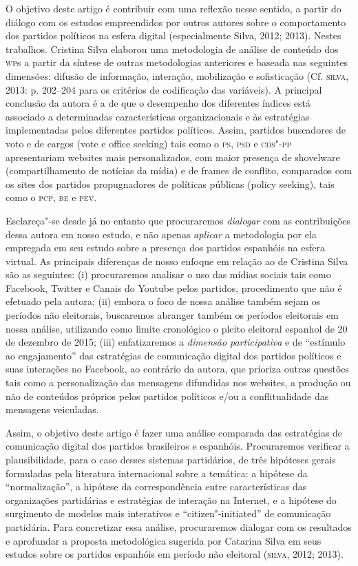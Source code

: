O objetivo deste artigo é contribuir com uma reflexão nesse sentido, a
partir do diálogo com os estudos empreendidos por outros autores sobre o
comportamento dos partidos políticos na esfera digital (especialmente
Silva, 2012; 2013). Nestes trabalhos. Cristina Silva elaborou uma
metodologia de análise de conteúdo dos \textsc{wp}s a partir da síntese de outras
metodologias anteriores e baseada nas seguintes dimensões: difusão de
informação, interação, mobilização e sofisticação (Cf. \textsc{silva}, 2013: p.
202--204 para os critérios de codificação das variáveis). A principal
conclusão da autora é a de que o desempenho dos diferentes índices está
associado a determinadas características organizacionais e às
estratégias implementadas pelos diferentes partidos políticos. Assim,
partidos buscadores de voto e de cargos (vote e office seeking) tais
como o \textsc{ps}, \textsc{psd} e \textsc{cds"-pp} apresentariam websites mais personalizados, com
maior presença de shovelware (compartilhamento de notícias da mídia) e
de frames de conflito, comparados com os sites dos partidos
propugnadores de políticas públicas (policy seeking), tais como o \textsc{pcp},
\textsc{be} e \textsc{pev}.

Esclareça"-se desde já no entanto que procuraremos \emph{dialogar} com as
contribuições dessa autora em nosso estudo, e não apenas \emph{aplicar}
a metodologia por ela empregada em seu estudo sobre a presença dos
partidos espanhóis na esfera virtual. As principais diferenças de nosso
enfoque em relação ao de Cristina Silva são as seguintes: (i)
procuraremos analisar o uso das mídias sociais tais como Facebook,
Twitter e Canais do Youtube pelos partidos, procedimento que não é
efetuado pela autora; (ii) embora o foco de nossa análise também sejam
os períodos não eleitorais, buscaremos abranger também os períodos
eleitorais em nossa análise, utilizando como limite cronológico o pleito
eleitoral espanhol de 20 de dezembro de 2015; (iii) enfatizaremos a
\emph{dimensão participativa} e de ``estímulo ao engajamento'' das
estratégias de comunicação digital dos partidos políticos e suas
interações no Facebook, ao contrário da autora, que prioriza outras
questões tais como a personalização das mensagens difundidas nos
websites, a produção ou não de conteúdos próprios pelos partidos
políticos e/ou a conflitualidade das mensagens veiculadas.

Assim, o objetivo deste artigo é fazer uma análise comparada das
estratégias de comunicação digital dos partidos brasileiros e espanhóis.
Procuraremos verificar a plausibilidade, para o caso desses sistemas
partidários, de três hipóteses gerais formuladas pela literatura
internacional sobre a temática: a hipótese da ``normalização'', a
hipótese da correspondência entre características das organizações
partidárias e estratégias de interação na Internet, e a hipótese do
surgimento de modelos mais interativos e ``citizen"-initiated'' de
comunicação partidária. Para concretizar essa análise, procuraremos
dialogar com os resultados e aprofundar a proposta metodológica sugerida
por Catarina Silva em seus estudos sobre os partidos espanhóis em
período não eleitoral (\textsc{silva}, 2012; 2013).

